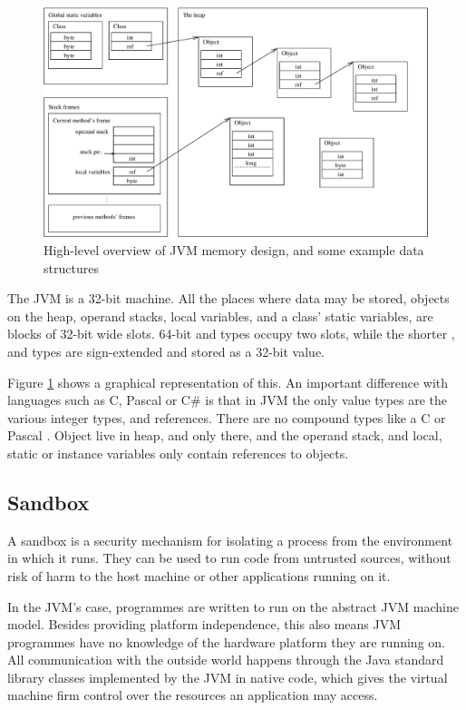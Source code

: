 \begin{figure}
\centering
\includegraphics[width=\linewidth]{jvmmemory.eps}
\caption[High-level overview of JVM memory design]{High-level overview of JVM memory design, and some example data structures}
\label{fig-jvm-memory}
\end{figure}

The JVM is a 32-bit machine. All the places where data may be stored, objects on the heap, operand stacks, local variables, and a class' static variables, are blocks of 32-bit wide slots. 64-bit  and  types occupy two slots, while the shorter , and  types are sign-extended and stored as a 32-bit value.
  
Figure \ref{fig-jvm-memory} shows a graphical representation of this. An important difference with languages such as C, Pascal or C\# is that in JVM the only value types are the various integer types, and references. There are no compound types like a C  or Pascal . Object live in heap, and only there, and the operand stack, and local, static or instance variables only contain references to objects.

\subsection{Sandbox}
A sandbox is a security mechanism for isolating a process from the environment in which it runs. They can be used to run code from untrusted sources, without risk of harm to the host machine or other applications running on it.

In the JVM's case, programmes are written to run on the abstract JVM machine model. Besides providing platform independence, this also means JVM programmes have no knowledge of the hardware platform they are running on. All communication with the outside world happens through the Java standard library classes implemented by the JVM in native code, which gives the virtual machine firm control over the resources an application may access.

